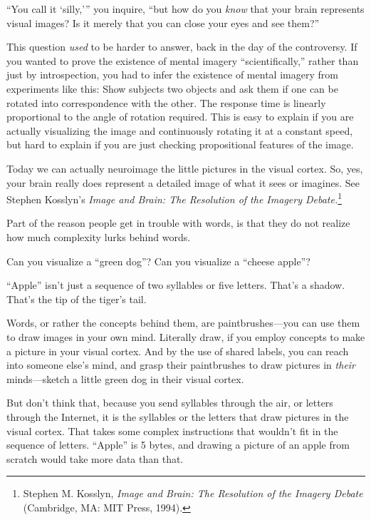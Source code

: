 {
 ``You call it
`silly,''' you
inquire, ``but how do you \textit{know} that your
brain represents visual images? Is it merely that you can close your
eyes and see them?''}

{
 This question \textit{used} to be harder to answer, back in the
day of the controversy. If you wanted to prove the existence of mental
imagery ``scientifically,'' rather
than just by introspection, you had to infer the existence of mental
imagery from experiments like this: Show subjects two objects and ask
them if one can be rotated into correspondence with the other. The
response time is linearly proportional to the angle of rotation
required. This is easy to explain if you are actually visualizing the
image and continuously rotating it at a constant speed, but hard to
explain if you are just checking propositional features of the image.}

{
 Today we can actually neuroimage the little pictures in the visual
cortex. So, yes, your brain really does represent a detailed image of
what it sees or imagines. See Stephen Kosslyn's
\textit{Image and Brain: The Resolution of the Imagery
Debate.}\footnote{Stephen M. Kosslyn, \textit{Image and Brain: The Resolution of
the Imagery Debate} (Cambridge, MA: MIT Press, 1994).}}

{
 Part of the reason people get in trouble with words, is that they
do not realize how much complexity lurks behind words.}

{
 Can you visualize a ``green
dog''? Can you visualize a ``cheese
apple''?}

{
 ``Apple'' isn't
just a sequence of two syllables or five letters.
That's a shadow. That's the tip of the
tiger's tail.}

{
 Words, or rather the concepts behind them, are paintbrushes---you
can use them to draw images in your own mind. Literally draw, if you
employ concepts to make a picture in your visual cortex. And by the use
of shared labels, you can reach into someone else's
mind, and grasp their paintbrushes to draw pictures in \textit{their}
minds---sketch a little green dog in their visual cortex.}

{
 But don't think that, because you send syllables
through the air, or letters through the Internet, it is the syllables
or the letters that draw pictures in the visual cortex. That takes some
complex instructions that wouldn't fit in the sequence
of letters. ``Apple'' is 5 bytes,
and drawing a picture of an apple from scratch would take more data
than that.}

